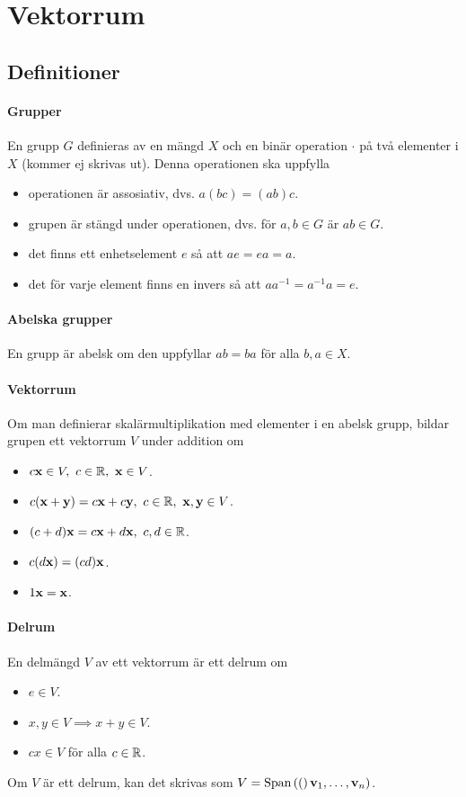 \section{Vektorrum}

\subsection{Definitioner}

\paragraph{Grupper}
En grupp $G$ definieras av en mängd $X$ och en binär operation $\cdot$ på två elementer i $X$ (kommer ej skrivas ut). Denna operationen ska uppfylla
\begin{itemize}
	\item operationen är assosiativ, dvs. $a(bc) = (ab)c$.
	\item grupen är stängd under operationen, dvs. för $a, b\in G$ är $ab\in G$.
	\item det finns ett enhetselement $e$ så att $ae = ea = a$.
	\item det för varje element finns en invers så att $aa^{-1} = a^{-1}a = e$.
\end{itemize}

\paragraph{Abelska grupper}
En grupp är abelsk om den uppfyllar $ab = ba$ för alla $b, a\in X$.

\paragraph{Vektorrum}
Om man definierar skalärmultiplikation med elementer i en abelsk grupp, bildar grupen ett vektorrum $V$ under addition om
\begin{itemize}
	\item $c\vect{x}\in V,~c\in\R,~\vect{x}\in V$.
	\item $c(\vect{x} + \vect{y}) = c\vect{x} + c\vect{y},~c\in\R,~\vect{x},\vect{y}\in V$.
	\item $(c + d)\vect{x} = c\vect{x} + d\vect{x},~c,d\in\R$.
	\item $c(d\vect{x}) = (cd)\vect{x}$.
	\item $1\vect{x} = \vect{x}$.
\end{itemize}

\paragraph{Delrum}
En delmängd $V$ av ett vektorrum är ett delrum om
\begin{itemize}
	\item $e\in V$.
	\item $x, y\in V\implies x + y\in V$.
	\item $cx\in V$ för alla $c\in\mathbb{R}$.
\end{itemize}
Om $V$ är ett delrum, kan det skrivas som $V = \Span(\vect{v}_1, \dots, \vect{v}_n)$.

